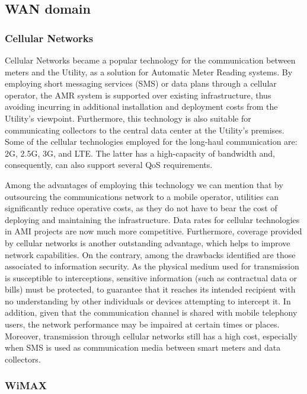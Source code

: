 \documentclass[10pt,twocolumn,twoside,submit]{JCNtran}
\begin{document}
\subsection{WAN domain}

\subsubsection{Cellular Networks}\label{tech::cellular}
Cellular Networks became a popular technology for the communication between meters and the Utility, as a solution for Automatic Meter Reading systems. By employing short messaging services (SMS) or data plans through a cellular operator, the AMR system is supported over existing infrastructure, thus avoiding incurring in additional installation and deployment costs from the Utility's viewpoint. Furthermore, this technology is also suitable for communicating collectors to the central data center at the Utility's premises. Some of the cellular technologies employed for the long-haul communication are: 2G, 2.5G, 3G, and LTE. The latter has a high-capacity of bandwidth and, consequently, can also support several QoS requirements.

Among the advantages of employing this technology we can mention that by outsourcing the communications network to a mobile operator, utilities can significantly reduce operative costs, as they do not have to bear the cost of deploying and maintaining the infrastructure. Data rates for cellular technologies in AMI projects are now much more competitive. Furthermore, coverage provided by cellular networks is another outstanding advantage, which helps to improve network capabilities. On the contrary, among the drawbacks identified are those associated to information security. As the physical medium used for transmission is susceptible to interceptions, sensitive information (such as contractual data or bills) must be protected, to guarantee that it reaches its intended recipient with no understanding by other individuals or devices attempting to intercept it. In addition, given that the communication channel is shared with mobile telephony users, the network performance may be impaired at certain times or places. Moreover, transmission through cellular networks still has a high cost, especially when SMS is used as communication media between smart meters and data collectors. 


\subsubsection{WiMAX}\label{tech::wimax}
\end{document}
